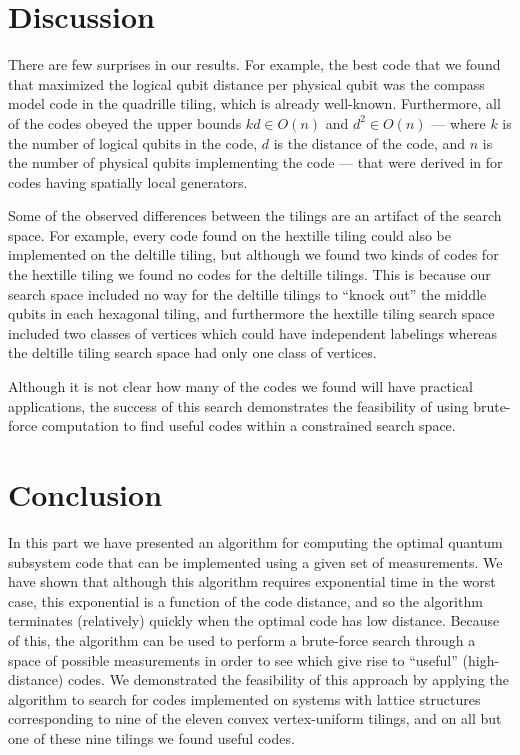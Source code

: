 \documentclass[12pt]{amsbook}
\theoremstyle{plain}
\theoremstyle{definition}
\theoremstyle{remark}
\begin{document}
\section{Discussion} \label{sec:discussion}

There are few surprises in our results.  For example, the best code that we found that maximized the logical qubit distance per physical qubit was the compass model code in the quadrille tiling, which is already well-known.  Furthermore, all of the codes obeyed the upper bounds $kd\in O(n)$ and $d^2\in O(n)$ --- where $k$ is the number of logical qubits in the code, $d$ is the distance of the code, and $n$ is the number of physical qubits implementing the code --- that were derived in \cite{Bravyi:10a} for codes having spatially local generators.

Some of the observed differences between the tilings are an artifact of the search space.  For example, every code found on the hextille tiling could also be implemented on the deltille tiling, but although we found two kinds of codes for the hextille tiling we found no codes for the deltille tilings.  This is because our search space included no way for the deltille tilings to ``knock out'' the middle qubits in each hexagonal tiling, and furthermore the hextille tiling search space included two classes of vertices which could have independent labelings whereas the deltille tiling search space had only one class of vertices.

Although it is not clear how many of the codes we found will have practical applications, the success of this search demonstrates the feasibility of using brute-force computation to find useful codes within a constrained search space.
\section{Conclusion}
\label{sec:conclusion}

In this part we have presented an algorithm for computing the optimal quantum subsystem code that can be implemented using a given set of measurements.  We have shown that although this algorithm requires exponential time in the worst case, this exponential is a function of the code distance, and so the algorithm terminates (relatively) quickly when the optimal code has low distance.  Because of this, the algorithm can be used to perform a brute-force search through a space of possible measurements in order to see which give rise to ``useful'' (high-distance) codes.  We demonstrated the feasibility of this approach by applying the algorithm to search for codes implemented on systems with lattice structures corresponding to nine of the eleven convex vertex-uniform tilings, and on all but one of these nine tilings we found useful codes.
\end{document}
